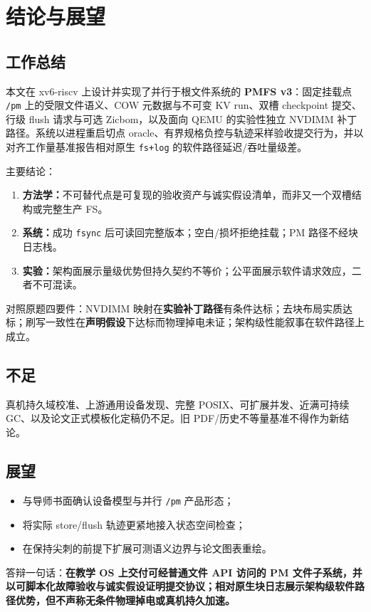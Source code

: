 \chapter{结论与展望}
\label{chap:concl}

\section{工作总结}

本文在 xv6-riscv 上设计并实现了并行于根文件系统的 \textbf{PMFS v3}：固定挂载点 \texttt{/pm} 上的受限文件语义、COW 元数据与不可变 KV run、双槽 checkpoint 提交、行级 flush 请求与可选 Zicbom，以及面向 QEMU 的实验性独立 NVDIMM 补丁路径。系统以进程重启切点 oracle、有界规格负控与轨迹采样验收提交行为，并以对齐工作量基准报告相对原生 \texttt{fs+log} 的软件路径延迟/吞吐量级差。

主要结论：

\begin{enumerate}[leftmargin=2em]
  \item \textbf{方法学：}不可替代点是可复现的验收资产与诚实假设清单，而非又一个双槽结构或完整生产 FS。
  \item \textbf{系统：}成功 \texttt{fsync} 后可读回完整版本；空白/损坏拒绝挂载；PM 路径不经块日志栈。
  \item \textbf{实验：}架构面展示量级优势但持久契约不等价；公平面展示软件请求效应，二者不可混读。
\end{enumerate}

对照原题四要件：NVDIMM 映射在\textbf{实验补丁路径}有条件达标；去块布局实质达标；刷写一致性在\textbf{声明假设}下达标而物理掉电未证；架构级性能叙事在软件路径上成立。

\section{不足}

真机持久域校准、上游通用设备发现、完整 POSIX、可扩展并发、近满可持续 GC、以及论文正式模板化定稿仍不足。旧 PDF/历史不等量基准不得作为新结论。

\section{展望}

\begin{itemize}[leftmargin=2em]
  \item 与导师书面确认设备模型与并行 \texttt{/pm} 产品形态；
  \item 将实际 store/flush 轨迹更紧地接入状态空间检查；
  \item 在保持尖刺的前提下扩展可测语义边界与论文图表重绘。
\end{itemize}

答辩一句话：\textbf{在教学 OS 上交付可经普通文件 API 访问的 PM 文件子系统，并以可脚本化故障验收与诚实假设证明提交协议；相对原生块日志展示架构级软件路径优势，但不声称无条件物理掉电或真机持久加速。}
